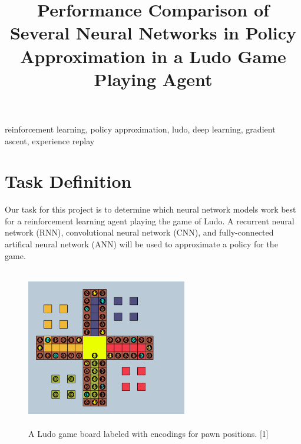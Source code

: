 \documentclass[conference]{IEEEtran}
\begin{document}
\title{Performance Comparison of Several Neural Networks in Policy
Approximation in a Ludo Game Playing Agent}

\author{


\and


\and


}

\maketitle

\begin{IEEEkeywords}
  reinforcement learning, policy approximation, ludo, deep learning, gradient
  ascent, experience replay
\end{IEEEkeywords}

\section{Task Definition}

Our task for this project is to determine which neural network models work
best for a reinforcement learning agent playing the game of Ludo. A recurrent
neural network (RNN), convolutional neural network (CNN), and fully-connected
artifical neural network (ANN) will be used to approximate a policy for the
game.

\begin{figure}[htbp]
    \centerline{\includegraphics[width=7cm, height=7cm]{fig1.png}}
    \caption{A Ludo game board labeled with encodings for pawn positions. [1]}
    \label{fig}
\end{figure}
\end{document}
